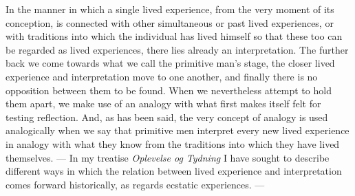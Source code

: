 \documentclass[12pt]{book}
\begin{document}
In the manner in which a single lived experience, from the very moment of its
conception, is connected with other simultaneous or past lived experiences, or
with traditions into which the individual has lived himself so that these too
can be regarded as lived experiences, there lies already an interpretation. The
further back we come towards what we call the primitive man's stage, the closer
lived experience and interpretation move to one another, and finally there is
no opposition between them to be found. When we nevertheless attempt to hold
them apart, we make use of an analogy with what first makes itself felt for
testing reflection. And, as has been said, the very concept of analogy is used
analogically when we say that primitive men interpret every new lived
experience in analogy with what they know from the traditions into which they
have lived themselves. --- In my treatise \textit{Oplevelse og Tydning} I have
sought to describe different ways in which the relation between lived
experience and interpretation comes forward historically, as regards ecstatic
experiences. ---
\end{document}
